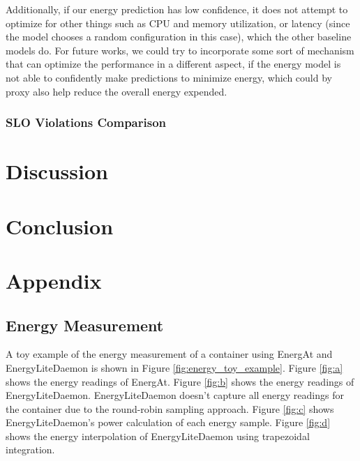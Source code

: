 \documentclass[times, 10pt,twocolumn]{article}
\begin{document}
Additionally, if our energy prediction has low confidence, it does not attempt to optimize for other things such as CPU and memory utilization, or latency (since the model chooses a random configuration in this case), which the other baseline models do. For future works, we could try to incorporate some sort of mechanism that can optimize the performance in a different aspect, if the energy model is not able to confidently make predictions to minimize energy, which could by proxy also help reduce the overall energy expended. 

\subsubsection{SLO Violations Comparison}


\section{Discussion}

\section{Conclusion}





\appendix
\section{Appendix}
\subsection{Energy Measurement}
\label{appendix:energy_measurement}
A toy example of the energy measurement of a container using EnergAt and EnergyLiteDaemon is shown in Figure \ref{fig:energy_toy_example}. Figure \ref{fig:a} shows the energy readings of EnergAt. Figure \ref{fig:b} shows the energy readings of EnergyLiteDaemon. EnergyLiteDaemon doesn't capture all energy readings for the container due to the round-robin sampling approach. Figure \ref{fig:c} shows EnergyLiteDaemon's power calculation of each energy sample. Figure \ref{fig:d} shows the energy interpolation of EnergyLiteDaemon using trapezoidal integration.
\end{document}
